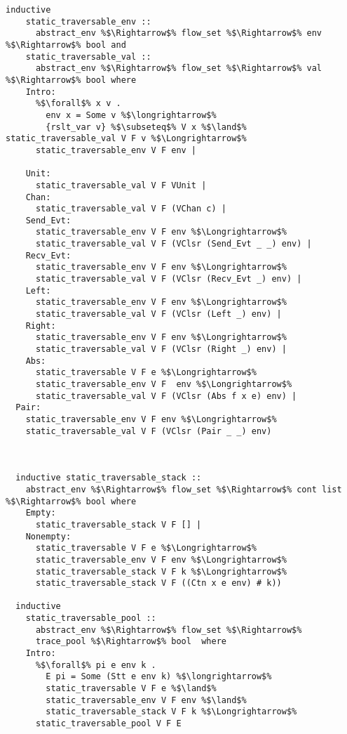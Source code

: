 \documentclass{article}
\begin{document}
\begin{lstlisting}[style=codestyle1, escapechar=\%]
  inductive 
    static_traversable_env ::
      abstract_env %$\Rightarrow$% flow_set %$\Rightarrow$% env %$\Rightarrow$% bool and
    static_traversable_val ::
      abstract_env %$\Rightarrow$% flow_set %$\Rightarrow$% val %$\Rightarrow$% bool where
    Intro:
      %$\forall$% x v .
        env x = Some v %$\longrightarrow$%
        {rslt_var v} %$\subseteq$% V x %$\land$% static_traversable_val V F v %$\Longrightarrow$%
      static_traversable_env V F env |

    Unit:
      static_traversable_val V F VUnit |
    Chan:
      static_traversable_val V F (VChan c) |
    Send_Evt:
      static_traversable_env V F env %$\Longrightarrow$%
      static_traversable_val V F (VClsr (Send_Evt _ _) env) |
    Recv_Evt:
      static_traversable_env V F env %$\Longrightarrow$%
      static_traversable_val V F (VClsr (Recv_Evt _) env) |
    Left:
      static_traversable_env V F env %$\Longrightarrow$%
      static_traversable_val V F (VClsr (Left _) env) |
    Right:
      static_traversable_env V F env %$\Longrightarrow$%
      static_traversable_val V F (VClsr (Right _) env) |
    Abs:
      static_traversable V F e %$\Longrightarrow$% 
      static_traversable_env V F  env %$\Longrightarrow$%
      static_traversable_val V F (VClsr (Abs f x e) env) |
  Pair:
    static_traversable_env V F env %$\Longrightarrow$%
    static_traversable_val V F (VClsr (Pair _ _) env) 



  inductive static_traversable_stack ::
    abstract_env %$\Rightarrow$% flow_set %$\Rightarrow$% cont list %$\Rightarrow$% bool where
    Empty:
      static_traversable_stack V F [] |
    Nonempty:
      static_traversable V F e %$\Longrightarrow$%
      static_traversable_env V F env %$\Longrightarrow$%
      static_traversable_stack V F k %$\Longrightarrow$% 
      static_traversable_stack V F ((Ctn x e env) # k))

  inductive
    static_traversable_pool ::
      abstract_env %$\Rightarrow$% flow_set %$\Rightarrow$%
      trace_pool %$\Rightarrow$% bool  where
    Intro:
      %$\forall$% pi e env k .
        E pi = Some (Stt e env k) %$\longrightarrow$% 
        static_traversable V F e %$\land$%
        static_traversable_env V F env %$\land$%
        static_traversable_stack V F k %$\Longrightarrow$% 
      static_traversable_pool V F E

  \end{lstlisting}
\end{document}
